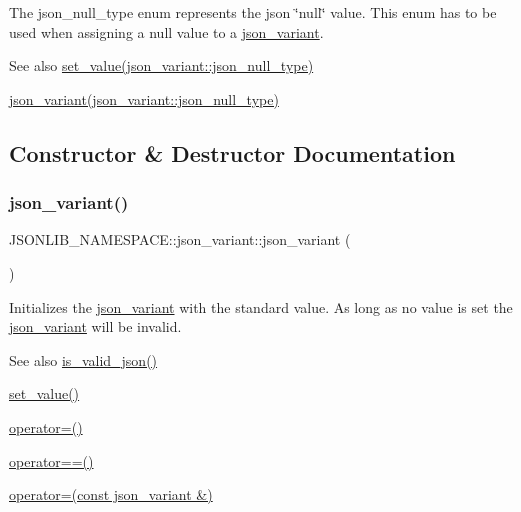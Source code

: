 The json\+\_\+null\+\_\+type enum represents the json \char`\"{}null\char`\"{} value. This enum has to be used when assigning a null value to a \hyperlink{classJSONLIB__NAMESPACE_1_1json__variant}{json\+\_\+variant}. 

\begin{DoxySeeAlso}{See also}
\hyperlink{classJSONLIB__NAMESPACE_1_1json__variant_a7a03b67a13382beb917ea7a3d446fcd2}{set\+\_\+value(json\+\_\+variant\+::json\+\_\+null\+\_\+type)} 

\hyperlink{classJSONLIB__NAMESPACE_1_1json__variant_a629877f8e133d0731ad96cf2972dd244}{json\+\_\+variant(json\+\_\+variant\+::json\+\_\+null\+\_\+type)} 
\end{DoxySeeAlso}


\subsection{Constructor \& Destructor Documentation}
\mbox{\label{classJSONLIB__NAMESPACE_1_1json__variant_a846c20ca7916959fcf8768f6c5bac36d}} 
\subsubsection{\texorpdfstring{json\+\_\+variant()}{json\_variant()}}
{\footnotesize\ttfamily J\+S\+O\+N\+L\+I\+B\+\_\+\+N\+A\+M\+E\+S\+P\+A\+C\+E\+::json\+\_\+variant\+::json\+\_\+variant (\begin{DoxyParamCaption}{ }\end{DoxyParamCaption})}



Initializes the \hyperlink{classJSONLIB__NAMESPACE_1_1json__variant}{json\+\_\+variant} with the standard value. As long as no value is set the \hyperlink{classJSONLIB__NAMESPACE_1_1json__variant}{json\+\_\+variant} will be invalid. 

\begin{DoxySeeAlso}{See also}
\hyperlink{classJSONLIB__NAMESPACE_1_1json__variant_a158e3148d9256af3d1b8251b2ca7b6c4}{is\+\_\+valid\+\_\+json()} 

\hyperlink{classJSONLIB__NAMESPACE_1_1json__variant_a0cfce194bda4d31ad37d765a6428974a}{set\+\_\+value()} 

\hyperlink{classJSONLIB__NAMESPACE_1_1json__variant_acab384801617885ba1dc3b965a456e7e}{operator=()} 

\hyperlink{classJSONLIB__NAMESPACE_1_1json__variant_aef1fc1a342cc170da06e0d3eb1299aad}{operator==()} 

\hyperlink{classJSONLIB__NAMESPACE_1_1json__variant_acab384801617885ba1dc3b965a456e7e}{operator=(const json\+\_\+variant \&)} 
\end{DoxySeeAlso}


